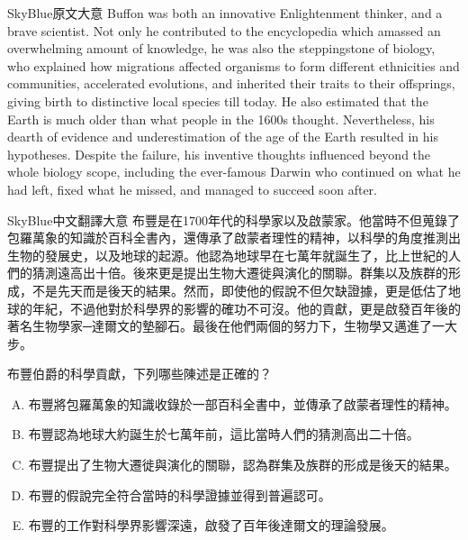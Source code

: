 \documentclass{article}
\begin{document}

\begin{large}
    \begin{boxpar}{SkyBlue}{原文大意}
Buffon was both an innovative Enlightenment thinker, and a brave
scientist. Not only he contributed to the encyclopedia which amassed an
overwhelming amount of knowledge, he was also the steppingstone of
biology, who explained how migrations affected organisms to form
different ethnicities and communities, accelerated evolutions, and
inherited their traits to their offsprings, giving birth to distinctive
local species till today. He also estimated that the Earth is much older
than what people in the 1600s thought. Nevertheless, his dearth of
evidence and underestimation of the age of the Earth resulted in his
hypotheses. Despite the failure, his inventive thoughts influenced
beyond the whole biology scope, including the ever-famous Darwin who
continued on what he had left, fixed what he missed, and managed to
succeed soon after.
\end{boxpar}
    \begin{boxpar}{SkyBlue}{中文翻譯大意}
布豐是在1700年代的科學家以及啟蒙家。他當時不但蒐錄了包羅萬象的知識於百科全書內，還傳承了啟蒙者理性的精神，以科學的角度推測出生物的發展史，以及地球的起源。他認為地球早在七萬年就誕生了，比上世紀的人們的猜測遠高出十倍。後來更是提出生物大遷徙與演化的關聯。群集以及族群的形成，不是先天而是後天的結果。然而，即使他的假說不但欠缺證據，更是低估了地球的年紀，不過他對於科學界的影響的確功不可沒。他的貢獻，更是啟發百年後的著名生物學家─達爾文的墊腳石。最後在他們兩個的努力下，生物學又邁進了一大步。
\end{boxpar}
\begin{tcolorbox}[title=多選題,colback=SkyBlue!5!white,colframe=SkyBlue!75!black]

布豐伯爵的科學貢獻，下列哪些陳述是正確的？\\

\begin{enumerate}[(A)]
    \item 布豐將包羅萬象的知識收錄於一部百科全書中，並傳承了啟蒙者理性的精神。
    \item 布豐認為地球大約誕生於七萬年前，這比當時人們的猜測高出二十倍。
    \item 布豐提出了生物大遷徙與演化的關聯，認為群集及族群的形成是後天的結果。
    \item 布豐的假說完全符合當時的科學證據並得到普遍認可。
    \item 布豐的工作對科學界影響深遠，啟發了百年後達爾文的理論發展。
\end{enumerate}


\end{tcolorbox}
\end{large}
\end{document}

